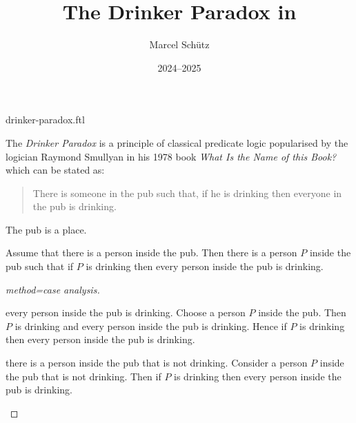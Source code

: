 \documentclass{article}
\title{The Drinker Paradox in \Naproche}
\author{Marcel Schütz}
\date{2024--2025}
\begin{document}
\begin{smodule}{drinker-paradox.ftl}
\maketitle


\noindent The \emph{Drinker Paradox} is a principle of classical predicate 
logic popularised by the logician Raymond Smullyan in his 1978 book
\textit{What Is the Name of this Book?} \cite{Smullyan1978} which can be 
stated as:

\begin{quotation}
  \noindent There is someone in the pub such that, if he is drinking then 
  everyone in the pub is drinking.
\end{quotation}

\begin{forthel}

  \begin{signature*}
    The pub is a place.
  \end{signature*}
  
  \begin{theorem*}[title=Drinker Paradox,id=drinker_paradox]
    Assume that there is a person inside the pub.
    Then there is a person $P$ inside the pub such that if $P$ is drinking then every person inside the pub is drinking.
  \end{theorem*}
  \begin{proof}[method=case analysis]
    \begin{case}{every person inside the pub is drinking.}
      Choose a person $P$ inside the pub.
      Then $P$ is drinking and every person inside the pub is drinking.
      Hence if $P$ is drinking then every person inside the pub is drinking.
    \end{case}
  
    \begin{case}{there is a person inside the pub that is not drinking.}
      Consider a person $P$ inside the pub that is not drinking.
      Then if $P$ is drinking then every person inside the pub is drinking.
    \end{case}
  \end{proof}
\end{forthel}

\printbibliography
{}
\end{smodule}
\end{document}
